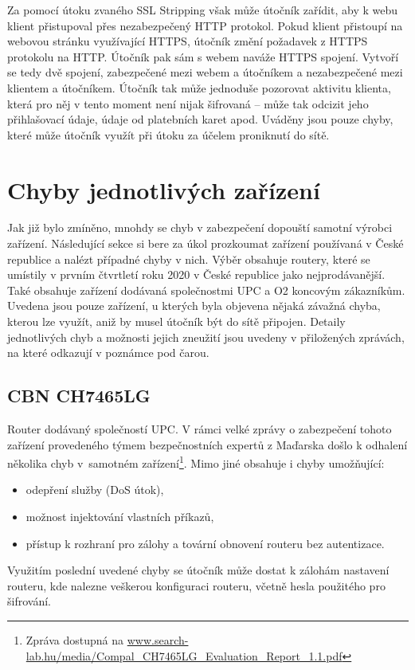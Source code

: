 Za pomocí útoku zvaného SSL Stripping však může útočník zařídit, aby k webu klient přistupoval přes nezabezpečený HTTP protokol. Pokud klient přistoupí na webovou stránku využívající HTTPS, útočník změní požadavek z HTTPS protokolu na HTTP. Útočník pak sám s webem naváže HTTPS spojení. Vytvoří se tedy dvě spojení, zabezpečené mezi webem a útočníkem a nezabezpečené mezi klientem a útočníkem. Útočník tak může jednoduše pozorovat aktivitu klienta, která pro něj v tento moment není nijak šifrovaná -- může tak odcizit jeho přihlašovací údaje, údaje od platebních karet apod. Uváděny jsou pouze chyby, které může útočník využít při útoku za účelem proniknutí do sítě.

\section{Chyby jednotlivých zařízení}
Jak již bylo zmíněno, mnohdy se chyb v zabezpečení dopouští samotní výrobci zařízení. Následující sekce si bere za úkol prozkoumat zařízení používaná v České republice a nalézt případné chyby v nich. Výběr obsahuje routery, které se umístily v prvním čtvrtletí roku 2020 v České republice jako nejprodávanější. Také obsahuje zařízení dodávaná společnostmi UPC a O2 koncovým zákazníkům. Uvedena jsou pouze zařízení, u kterých byla objevena nějaká závažná chyba, kterou lze využít, aniž by musel útočník být do sítě připojen. Detaily jednotlivých chyb a možnosti jejich zneužití jsou uvedeny v přiložených zprávách, na které odkazují v poznámce pod čarou.

\subsection*{CBN CH7465LG}
Router dodávaný společností UPC. V rámci velké zprávy o zabezpečení tohoto zařízení provedeného týmem bezpečnostních expertů z Maďarska došlo k odhalení několika chyb v~samotném zařízení\footnote{Zpráva dostupná na \url{www.search-lab.hu/media/Compal_CH7465LG_Evaluation_Report_1.1.pdf}}. Mimo jiné obsahuje i chyby umožňující:
\begin{itemize}
  \item{odepření služby (DoS útok),}
  \item{možnost injektování vlastních příkazů,}
  \item{přístup k rozhraní pro zálohy a tovární obnovení routeru bez autentizace.}
\end{itemize}
Využitím poslední uvedené chyby se útočník může dostat k zálohám nastavení routeru, kde nalezne veškerou konfiguraci routeru, včetně hesla použitého pro šifrování.

